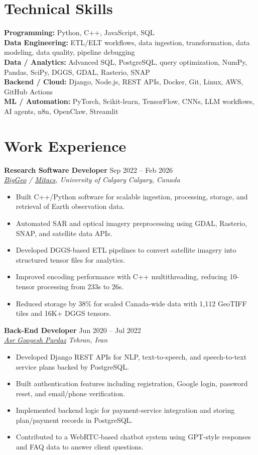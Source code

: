 \documentclass[a4paper,10pt]{article}
\newcommand{\resumeSubheading}[4]{
    \textbf{#1} \hfill #2 \\
    \textit{#3} \hfill \textit{#4}
}
\begin{document}
\section*{Technical Skills}

\textbf{Programming:} Python, C++, JavaScript, SQL \\
\textbf{Data Engineering:} ETL/ELT workflows, data ingestion, transformation, data modeling, data quality, pipeline debugging \\
\textbf{Data / Analytics:} Advanced SQL, PostgreSQL, query optimization, NumPy, Pandas, SciPy, DGGS, GDAL, Rasterio, SNAP \\
\textbf{Backend / Cloud:} Django, Node.js, REST APIs, Docker, Git, Linux, AWS, GitHub Actions \\
\textbf{ML / Automation:} PyTorch, Scikit-learn, TensorFlow, CNNs, LLM workflows, AI agents, n8n, OpenClaw, Streamlit


\section*{Work Experience}

\resumeSubheading
{Research Software Developer}
{Sep 2022 -- Feb 2026}
{\href{https://biggeo.com}{BigGeo} / \href{https://www.mitacs.ca/}{Mitacs}, University of Calgary}
{Calgary, Canada}
\begin{itemize}[leftmargin=0.25in]
    \item Built C++/Python software for scalable ingestion, processing, storage, and retrieval of Earth observation data.
    \item Automated SAR and optical imagery preprocessing using GDAL, Rasterio, SNAP, and satellite data APIs.
    \item Developed DGGS-based ETL pipelines to convert satellite imagery into structured tensor files for analytics.
    \item Improved encoding performance with C++ multithreading, reducing 10-tensor processing from 233s to 26s.
    \item Reduced storage by 38\% for scaled Canada-wide data with 1,112 GeoTIFF tiles and 16K+ DGGS tensors.
\end{itemize}

\resumeSubheading
{Back-End Developer}
{Jun 2020 -- Jul 2022}
{\href{https://asr-gooyesh.com/en/}{Asr Gooyesh Pardaz}}
{Tehran, Iran}
\begin{itemize}[leftmargin=0.25in]
    \item Developed Django REST APIs for NLP, text-to-speech, and speech-to-text service plans backed by PostgreSQL.
    \item Built authentication features including registration, Google login, password reset, and email/phone verification.
    \item Implemented backend logic for payment-service integration and storing plan/payment records in PostgreSQL.
    \item Contributed to a WebRTC-based chatbot system using GPT-style responses and FAQ data to answer client questions.
\end{itemize}
\end{document}

